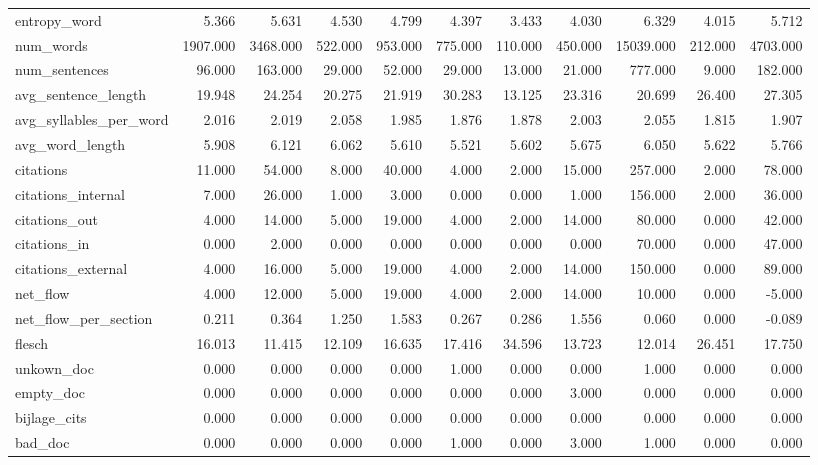 \begin{tabular}{lrrrrrrrrrr}
\cline{1-11}
entropy\_word & 5.366 & 5.631 & 4.530 & 4.799 & 4.397 & 3.433 & 4.030 & 6.329 & 4.015 & 5.712 \\
\cline{1-11}
num\_words & 1907.000 & 3468.000 & 522.000 & 953.000 & 775.000 & 110.000 & 450.000 & 15039.000 & 212.000 & 4703.000 \\
\cline{1-11}
num\_sentences & 96.000 & 163.000 & 29.000 & 52.000 & 29.000 & 13.000 & 21.000 & 777.000 & 9.000 & 182.000 \\
\cline{1-11}
avg\_sentence\_length & 19.948 & 24.254 & 20.275 & 21.919 & 30.283 & 13.125 & 23.316 & 20.699 & 26.400 & 27.305 \\
\cline{1-11}
avg\_syllables\_per\_word & 2.016 & 2.019 & 2.058 & 1.985 & 1.876 & 1.878 & 2.003 & 2.055 & 1.815 & 1.907 \\
\cline{1-11}
avg\_word\_length & 5.908 & 6.121 & 6.062 & 5.610 & 5.521 & 5.602 & 5.675 & 6.050 & 5.622 & 5.766 \\
\cline{1-11}
citations & 11.000 & 54.000 & 8.000 & 40.000 & 4.000 & 2.000 & 15.000 & 257.000 & 2.000 & 78.000 \\
\cline{1-11}
citations\_internal & 7.000 & 26.000 & 1.000 & 3.000 & 0.000 & 0.000 & 1.000 & 156.000 & 2.000 & 36.000 \\
\cline{1-11}
citations\_out & 4.000 & 14.000 & 5.000 & 19.000 & 4.000 & 2.000 & 14.000 & 80.000 & 0.000 & 42.000 \\
\cline{1-11}
citations\_in & 0.000 & 2.000 & 0.000 & 0.000 & 0.000 & 0.000 & 0.000 & 70.000 & 0.000 & 47.000 \\
\cline{1-11}
citations\_external & 4.000 & 16.000 & 5.000 & 19.000 & 4.000 & 2.000 & 14.000 & 150.000 & 0.000 & 89.000 \\
\cline{1-11}
net\_flow & 4.000 & 12.000 & 5.000 & 19.000 & 4.000 & 2.000 & 14.000 & 10.000 & 0.000 & -5.000 \\
\cline{1-11}
net\_flow\_per\_section & 0.211 & 0.364 & 1.250 & 1.583 & 0.267 & 0.286 & 1.556 & 0.060 & 0.000 & -0.089 \\
\cline{1-11}
flesch & 16.013 & 11.415 & 12.109 & 16.635 & 17.416 & 34.596 & 13.723 & 12.014 & 26.451 & 17.750 \\
\cline{1-11}
unkown\_doc & 0.000 & 0.000 & 0.000 & 0.000 & 1.000 & 0.000 & 0.000 & 1.000 & 0.000 & 0.000 \\
\cline{1-11}
empty\_doc & 0.000 & 0.000 & 0.000 & 0.000 & 0.000 & 0.000 & 3.000 & 0.000 & 0.000 & 0.000 \\
\cline{1-11}
bijlage\_cits & 0.000 & 0.000 & 0.000 & 0.000 & 0.000 & 0.000 & 0.000 & 0.000 & 0.000 & 0.000 \\
\cline{1-11}
bad\_doc & 0.000 & 0.000 & 0.000 & 0.000 & 1.000 & 0.000 & 3.000 & 1.000 & 0.000 & 0.000 \\
\cline{1-11}
\bottomrule
\end{tabular}
